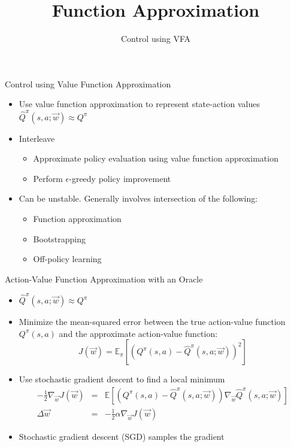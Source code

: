 \documentclass[aspectratio=169]{../latex_main/tntbeamer}  %
\title[RL: Function Approximation]{Function Approximation}
\subtitle{Control using VFA}
\begin{document}
	
	\maketitle

\begin{frame}[c]{Control using Value Function Approximation}
	
	\begin{itemize}
		\item Use value function approximation to represent state-action values $\hat{Q}^\pi(s,a;\vec{w}) \approx Q^\pi$
		\item Interleave
		\begin{itemize}
			\item Approximate policy evaluation using value function approximation
			\item Perform $\epsilon$-greedy policy improvement
		\end{itemize}
		\item Can be unstable. Generally involves intersection of the following:
		\begin{itemize}
			\item Function approximation
			\item Bootstrapping
			\item \alert{Off-policy learning}
		\end{itemize}
	\end{itemize}

\end{frame}
\begin{frame}[c]{Action-Value Function Approximation with an Oracle}
	
	\begin{itemize}
		\item $\hat{Q}^\pi(s,a;\vec{w}) \approx Q^\pi$
		\item Minimize the mean-squared error between the true action-value function $Q^\pi(s,a)$ and the approximate action-value function:
		$$J(\vec{w}) = \mathbb{E}_\pi [(Q^\pi(s,a) - \hat{Q}^\pi(s,a;\vec{w}))^2] $$
		\item Use stochastic gradient descent to find a local minimum
		\begin{eqnarray}
			-\frac{1}{2}\nabla_\vec{w} J(\vec{w}) &=& \mathbb{E}\left[ (Q^\pi(s,a) - \hat{Q}^\pi(s,a;\vec{w})) \nabla_\vec{w} \hat{Q}^\pi(s,a;\vec{w}) \right]\nonumber\\
			\Delta \vec{w} &=& -\frac{1}{2}\alpha\nabla_\vec{w} J(\vec{w})\nonumber
		\end{eqnarray}
		\item Stochastic gradient descent (SGD) samples the gradient
	\end{itemize}
	
\end{frame}
\end{document}
